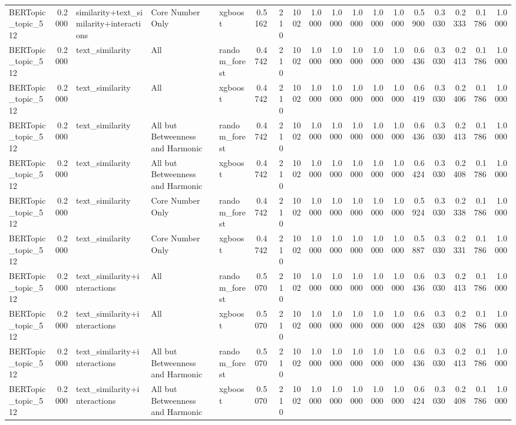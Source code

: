 \begin{tabular}{lrlllrrrrrrrrrrrrr}
BERTopic_topic_512 & 0.2000 & similarity+text_similarity+interactions & Core Number Only & xgboost & 0.5162 & 210 & 1002 & 1.0000 & 1.0000 & 1.0000 & 1.0000 & 1.0000 & 0.5900 & 0.3030 & 0.2333 & 0.1786 & 1.0000 \\
BERTopic_topic_512 & 0.2000 & text_similarity & All & random_forest & 0.4742 & 210 & 1002 & 1.0000 & 1.0000 & 1.0000 & 1.0000 & 1.0000 & 0.6436 & 0.3030 & 0.2413 & 0.1786 & 1.0000 \\
BERTopic_topic_512 & 0.2000 & text_similarity & All & xgboost & 0.4742 & 210 & 1002 & 1.0000 & 1.0000 & 1.0000 & 1.0000 & 1.0000 & 0.6419 & 0.3030 & 0.2406 & 0.1786 & 1.0000 \\
BERTopic_topic_512 & 0.2000 & text_similarity & All but Betweenness and Harmonic & random_forest & 0.4742 & 210 & 1002 & 1.0000 & 1.0000 & 1.0000 & 1.0000 & 1.0000 & 0.6436 & 0.3030 & 0.2413 & 0.1786 & 1.0000 \\
BERTopic_topic_512 & 0.2000 & text_similarity & All but Betweenness and Harmonic & xgboost & 0.4742 & 210 & 1002 & 1.0000 & 1.0000 & 1.0000 & 1.0000 & 1.0000 & 0.6424 & 0.3030 & 0.2408 & 0.1786 & 1.0000 \\
BERTopic_topic_512 & 0.2000 & text_similarity & Core Number Only & random_forest & 0.4742 & 210 & 1002 & 1.0000 & 1.0000 & 1.0000 & 1.0000 & 1.0000 & 0.5924 & 0.3030 & 0.2338 & 0.1786 & 1.0000 \\
BERTopic_topic_512 & 0.2000 & text_similarity & Core Number Only & xgboost & 0.4742 & 210 & 1002 & 1.0000 & 1.0000 & 1.0000 & 1.0000 & 1.0000 & 0.5887 & 0.3030 & 0.2331 & 0.1786 & 1.0000 \\
BERTopic_topic_512 & 0.2000 & text_similarity+interactions & All & random_forest & 0.5070 & 210 & 1002 & 1.0000 & 1.0000 & 1.0000 & 1.0000 & 1.0000 & 0.6436 & 0.3030 & 0.2413 & 0.1786 & 1.0000 \\
BERTopic_topic_512 & 0.2000 & text_similarity+interactions & All & xgboost & 0.5070 & 210 & 1002 & 1.0000 & 1.0000 & 1.0000 & 1.0000 & 1.0000 & 0.6428 & 0.3030 & 0.2408 & 0.1786 & 1.0000 \\
BERTopic_topic_512 & 0.2000 & text_similarity+interactions & All but Betweenness and Harmonic & random_forest & 0.5070 & 210 & 1002 & 1.0000 & 1.0000 & 1.0000 & 1.0000 & 1.0000 & 0.6436 & 0.3030 & 0.2413 & 0.1786 & 1.0000 \\
BERTopic_topic_512 & 0.2000 & text_similarity+interactions & All but Betweenness and Harmonic & xgboost & 0.5070 & 210 & 1002 & 1.0000 & 1.0000 & 1.0000 & 1.0000 & 1.0000 & 0.6424 & 0.3030 & 0.2408 & 0.1786 & 1.0000 \\

\end{tabular}
